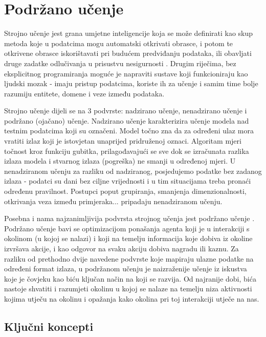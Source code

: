 \chapter{Podržano učenje}

Strojno učenje  jest grana umjetne inteligencije  koja se može definirati kao skup metoda koje u podatcima mogu automatski otkrivati obrasce, i potom te otkrivene obrasce iskorištavati pri budućem predviđanju podataka, ili obavljati druge zadatke odlučivanja u prisustvu nesigurnosti \cite{CupicUvod}. Drugim riječima, bez eksplicitnog programiranja moguće je napraviti sustave koji funkcioniraju kao ljudski mozak - imaju pristup podatcima, koriste ih za učenje i samim time bolje razumiju entitete, domene i veze između podataka. 

Strojno učenje dijeli se na 3 podvrste: nadzirano učenje, nenadzirano učenje i podržano (ojačano) učenje. Nadzirano učenje  karakterizira učenje modela nad testnim podatcima koji su označeni. Model točno zna da za određeni ulaz mora vratiti izlaz koji je istovjetan unaprijed pridruženoj oznaci. Algoritam mjeri točnost kroz funkciju gubitka, prilagođavajući se sve dok se izračunata razlika izlaza modela i stvarnog izlaza (pogreška) ne smanji u određenoj mjeri. U nenadziranom učenju  za razliku od nadziranog, posjedujemo podatke bez zadanog izlaza - podatci su dani bez ciljne vrijednosti i u tim situacijama treba pronaći određenu pravilnost. Postupci poput grupiranja, smanjenja dimenzionalnosti, otkrivanja veza između primjeraka... pripadaju nenadziranom učenju.

Posebna i nama najzanimljivija podvrsta strojnog učenja jest podržano učenje . Podržano učenje bavi se optimizacijom ponašanja agenta koji je u interakciji s okolinom (u kojoj se nalazi) i koji na temelju informacija koje dobiva iz okoline izvršava akcije, i kao odgovor na svaku akciju dobiva nagradu ili kaznu. Za razliku od prethodno dvije navedene podvrste koje mapiraju ulazne podatke na određeni format izlaza, u podržanom učenju je naizraženije učenje iz iskustva koje je čovjeku kao biću ključan način na koji se razvija. Od najranije dobi, bića nastoje shvatiti i razumjeti okolinu u kojoj se nalaze na temelju niza aktivnosti kojima utječu na okolinu i opažanja kako okolina pri toj interakciji utječe na nas. 

\section{Ključni koncepti}

